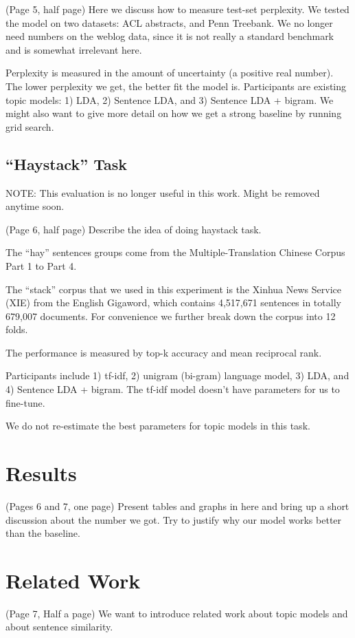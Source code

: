 { \color{red} (Page 5, half page) Here we discuss how to measure test-set
perplexity.  We tested the model on two datasets: ACL abstracts, and Penn
Treebank.  We no longer need numbers on the weblog data, since it is not really
a standard benchmark and is somewhat irrelevant here.

Perplexity is measured in the amount of uncertainty (a positive real number).
The lower perplexity we get, the better fit the model is.  Participants are
existing topic models: 1) LDA, 2) Sentence LDA, and 3) Sentence LDA + bigram.
We might also want to give more detail on how we get a strong baseline by
running grid search. }

\subsection{``Haystack'' Task}

{ \color{red} NOTE: This evaluation is no longer useful in this work.  Might be
removed anytime soon. }

{ \color{red} (Page 6, half page) Describe the idea of doing haystack task. 

The ``hay'' sentences groups come from the Multiple-Translation Chinese Corpus
Part 1 to Part 4.  

The ``stack'' corpus that we used in this experiment is the Xinhua News Service
(XIE) from the English Gigaword, which contains 4,517,671 sentences in totally
679,007 documents.  For convenience we further break down the corpus into 12
folds.

The performance is measured by top-k accuracy and mean reciprocal rank.

Participants include 1) tf-idf, 2) unigram (bi-gram) language model, 3) LDA,
and 4) Sentence LDA + bigram.  The tf-idf model doesn't have parameters for us
to fine-tune.

We do not re-estimate the best parameters for topic models in this task. }

\section{Results} { \color{red} (Pages 6 and 7, one page) Present tables and graphs in
here and bring up a short discussion about the number we got.  Try to justify
why our model works better than the baseline. }

\section{Related Work} { \color{red} (Page 7, Half a page)  We want to introduce related work
about topic models and about sentence similarity. }

